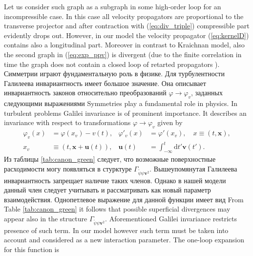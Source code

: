 \documentclass[12pt]{article}
\def\mv{{\bm v}}
\def\dRM{{\mathrm d}}
\def\mx{{\bm x}}
\def\bmu{{\bm u}}
\begin{document}
Let us consider such graph as a subgraph in some high-order loop for an incompressible case.
In this case all velocity propagators are proportional to the transverse projector and after contraction
with (\ref{eq:div_triple}) compressible part evidently drops out. However, in our model the 
 velocity propagator (\ref{eq:kernelD}) contains also a longitudinal part.
Moreover in contrast to Kraichnan model, also the second graph in (\ref{eq:exp_ppv}) is  divergent
 (due to the finite correlation in time the graph does not contain a closed loop of retarted propagators \cite{Vasiliev,Tauber2014}).
Симметрии играют фундаментальную роль в физике.
Для турбулентности Галилеева инвариантность \cite{Vasiliev} имеет большое значение.
Она описывает инвариантность законов относительно преобразований $\varphi\rightarrow\varphi_v$, заданных следующими выражениями
Symmetries play a fundamental role in physics. In turbulent problems  Galilei invariance \cite{Vasiliev} is of prominent
importance. It describes an invariance with respect to transformations
$\varphi\rightarrow\varphi_v$ given by
\begin{align} 
  \varphi_v(x)& = \varphi(x_v) - v(t), &\varphi'_v(x)& = \varphi'(x_v),\quad x \equiv (t,\mx),\nonumber\\
  x_v &\equiv (t,\mx+\bmu(t)),
  &\bmu(t)& =  \int_{-\infty}^t \dRM t' \mv(t'). 
\end{align}
Из таблицы \ref{tab:canon_green} следует, что возможные поверхностные расходимости могу появляться в стурктуре $\Gamma_{\tilde{\psi}\psi \mv^2}$.
Вышеупомянутая Галилеева инвариантность запрещает наличие таких членов.
Однако в нашей модели данный член следует учитывать и рассматривать как новый параметр взаимодействия.
Однопетлевое выражение для данной функции имеет вид
From Table \ref{tab:canon_green} it follows that possible superficial divergences may appear
also in the structure $\Gamma_{\tilde{\psi}\psi \mv^2}$. Aforementioned Galilei invariance
restricts presence of such term. In our model however such term must be taken into
account and considered as a new interaction parameter. The one-loop expansion for this function is
\end{document}
